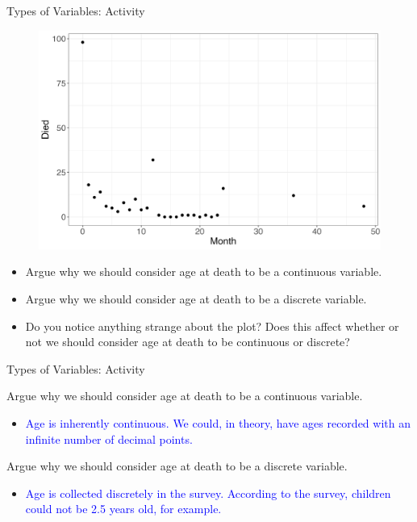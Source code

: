 \documentclass[10pt,t]{beamer}
\begin{document}
\begin{frame}{Types of Variables: Activity}
\begin{figure}
	\centering \includegraphics[scale=0.25]{u5mr.png}
\end{figure}
	
\vspace{0.1cm}

\begin{itemize}
	\item Argue why we should consider age at death to be a continuous variable.
	\item Argue why we should consider age at death to be a discrete variable.
	\item Do you notice anything strange about the plot? Does this affect whether or not we should consider age at death to be continuous or discrete?
\end{itemize}

\end{frame}

\begin{frame}{Types of Variables: Activity}

Argue why we should consider age at death to be a continuous variable.
	
	\vspace{0.3cm}
	
	\begin{itemize}
		\item[] \textcolor{blue}{Age is inherently continuous. We could, in theory, have ages recorded with an infinite number of decimal points.}
	\end{itemize}
	
		
	
	\vspace{0.3cm}
	
	Argue why we should consider age at death to be a discrete variable.
	
	\vspace{0.3cm}
	
	\begin{itemize}
		\item[] 	\textcolor{blue}{Age is collected discretely in the survey. According to the survey, children could not be 2.5 years old, for example. }
	\end{itemize}

	

\end{frame}
\end{document}
